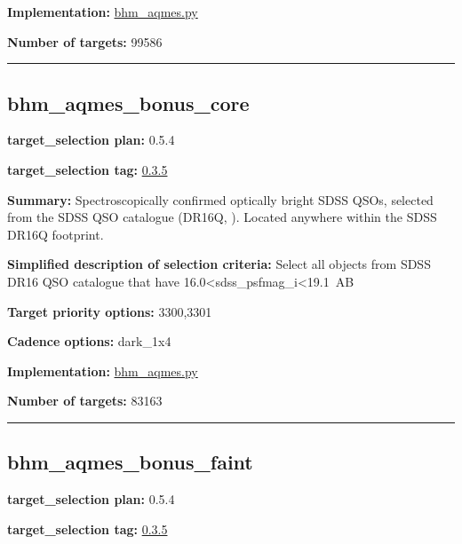 \noindent\textbf{Implementation:}
\href{https://github.com/sdss/target_selection/blob/0.3.5/python/target_selection/cartons/bhm_aqmes.py}{bhm\_aqmes.py}

\noindent\textbf{Number of targets:} 99586

\begin{center}\rule{0.5\linewidth}{0.5pt}\end{center}

\hypertarget{bhm_aqmes_bonus_core_plan0.5.4}{%
\subsection{bhm\_aqmes\_bonus\_core}\label{bhm_aqmes_bonus_core_plan0.5.4}}

\noindent\textbf{target\_selection plan:} 0.5.4

\noindent\textbf{target\_selection tag:}
\href{https://github.com/sdss/target_selection/tree/0.3.5/}{0.3.5}

\noindent\textbf{Summary:} Spectroscopically confirmed optically bright SDSS
QSOs, selected from the SDSS QSO catalogue (DR16Q,
\citealt{Lyke2020}). Located anywhere within the SDSS DR16Q footprint.

\noindent\textbf{Simplified description of selection criteria:} Select all
objects from SDSS DR16 QSO catalogue that have
16.0\textless sdss\_psfmag\_i\textless19.1~AB


\noindent\textbf{Target priority options:} 3300,3301

\noindent\textbf{Cadence options:} dark\_1x4

\noindent\textbf{Implementation:}
\href{https://github.com/sdss/target_selection/blob/0.3.5/python/target_selection/cartons/bhm_aqmes.py}{bhm\_aqmes.py}

\noindent\textbf{Number of targets:} 83163

\begin{center}\rule{0.5\linewidth}{0.5pt}\end{center}

\hypertarget{bhm_aqmes_bonus_faint_plan0.5.4}{%
\subsection{bhm\_aqmes\_bonus\_faint}\label{bhm_aqmes_bonus_faint_plan0.5.4}}

\noindent\textbf{target\_selection plan:} 0.5.4

\noindent\textbf{target\_selection tag:}
\href{https://github.com/sdss/target_selection/tree/0.3.5/}{0.3.5}

